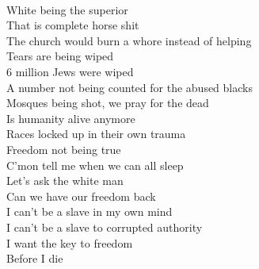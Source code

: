 \documentclass[12pt, b5paper]{article}
\begin{document}
\\White being the superior
\\That is complete horse shit
\\The church would burn a whore instead of helping
\\Tears are being wiped
\\6 million Jews were wiped
\\A number not being counted for the abused blacks
\\Mosques being shot, we pray for the dead
\\Is humanity alive anymore
\\Races locked up in their own trauma
\\Freedom not being true
\\C'mon tell me when we can all sleep
\\Let's ask the white man
\\Can we have our freedom back
\\I can't be a slave in my own mind
\\I can't be a slave to corrupted authority
\\I want the key to freedom
\\Before I die 

\newpage
\end{document}
